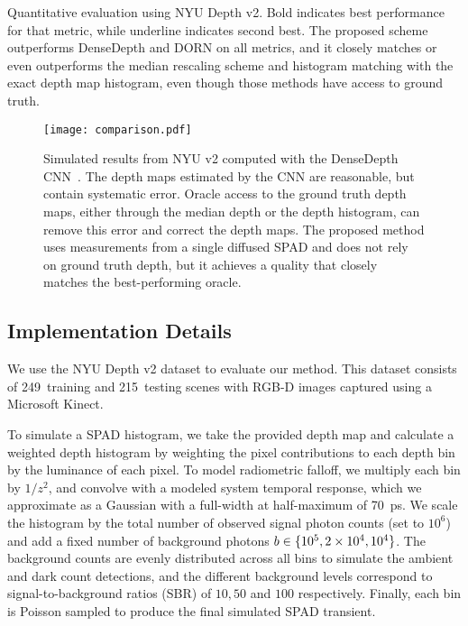 \begin{table*}[!t]
\begin{center}

\caption{Quantitative evaluation using NYU Depth v2. Bold indicates best
performance for that metric, while underline indicates second best. The proposed
scheme outperforms DenseDepth and DORN on all metrics, and it closely matches or
even outperforms the median rescaling scheme and histogram matching with the
exact depth map histogram, even though those methods have access to ground
truth.}
\vspace{-2em}
\label{tab:comparison}
\end{center}
\end{table*}

\begin{figure*}[!h]
  \texttt{[image: comparison.pdf]}
  \caption{Simulated results from NYU v2 computed with the DenseDepth
  CNN~\cite{Alhashim2018}. The depth maps estimated by the CNN are reasonable,
  but contain systematic error. Oracle access to the ground truth depth maps,
  either through the median depth or the depth histogram, can remove this error
  and correct the depth maps. The proposed method uses measurements from a
  single diffused SPAD and does not rely on ground truth depth, but it achieves
  a quality that closely matches the best-performing oracle.}
	\label{fig:results_simulated}
  \vspace{-1em}
\end{figure*}


\subsection{Implementation Details}

We use the NYU Depth v2 dataset to evaluate our method. This dataset consists of
249~training and 215~testing scenes with RGB-D images captured using a Microsoft
Kinect.

To simulate a SPAD histogram, we take the provided depth map and 
calculate a weighted depth histogram by weighting the pixel contributions to
each depth bin by the luminance of each pixel. To model radiometric falloff, we
multiply each bin by $1/z^2$, and convolve with a modeled system temporal
response, which we approximate as a Gaussian with a full-width at half-maximum of 70~ps. We scale
the histogram by the total number of observed signal photon counts (set to 
$10^6$) and  add a fixed number of background photons $b \in \{10^5, 2\times
10^4, 10^4\}$. The background counts are evenly distributed across all bins to simulate the ambient and dark
count detections, and the different background levels correspond to
signal-to-background ratios (SBR) of $10, 50$ and $100$ respectively. Finally,
each bin is Poisson sampled to produce the final simulated SPAD transient.

